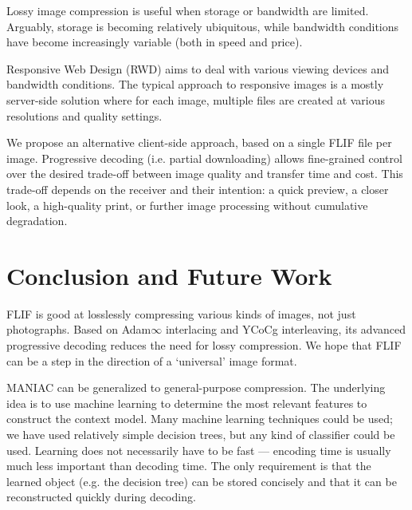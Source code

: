 \documentclass{article}
\begin{document}
Lossy image compression is useful when storage or bandwidth are limited.
Arguably, %
storage is becoming relatively ubiquitous, while bandwidth conditions
have become increasingly variable (both in speed and price).

Responsive Web Design (RWD) aims to deal with various viewing devices and bandwidth conditions.
The typical approach to responsive images
is a mostly server-side solution where for each image, multiple files are created at various resolutions and quality settings.

We propose an alternative client-side approach, based on a single FLIF file per image.
Progressive decoding (i.e. partial downloading) allows fine-grained control over the desired
trade-off between image quality and transfer time and cost.
This trade-off depends on the receiver and their intention:
a quick preview,
a closer look,
a high-quality print,
or further image processing without cumulative degradation.

\section{Conclusion and Future Work}

FLIF is good at losslessly compressing various kinds of images, not just photographs.
Based on Adam$\infty$ interlacing and YCoCg interleaving,
its advanced progressive decoding
reduces the need for lossy compression.
We hope that FLIF can be a step in the direction of a `universal' image format.

MANIAC can be generalized to general-purpose compression.
%
The underlying idea is to use machine learning to determine the most relevant features to construct the context model.
Many machine learning techniques could be used; we have used relatively simple decision trees, but any kind of classifier could be used.
Learning does not necessarily have to be fast --- encoding time is usually much less important than decoding time.
The only requirement is that the learned object (e.g. the decision tree) can be stored concisely and
that it can be reconstructed quickly during decoding.
\end{document}
